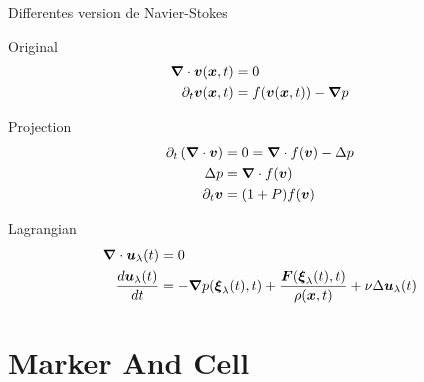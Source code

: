 \begin{frame}[<+->]{Differentes version de Navier-Stokes}
 \begin{block}{Original}
 \begin{align*}
  {\boldsymbol {\nabla}} \cdot {\boldsymbol {v}}({\boldsymbol {x}} ,t)&=0\\
\partial_t {\boldsymbol {v}}({\boldsymbol {x}} ,t)&=f({\boldsymbol {v}}({\boldsymbol {x}},t))-{\boldsymbol {\nabla}}p
\end{align*}
 \end{block}
 \begin{block}{Projection}
 \begin{align*}
    \partial_t \left({\boldsymbol {\nabla}}\cdot {\boldsymbol {v}}\right)&=0={\boldsymbol {\nabla}}\cdot f({\boldsymbol {v}})-\Delta p\\
  \Delta p&={\boldsymbol {\nabla}}\cdot f({\boldsymbol {v}})\\
  \partial_t {\boldsymbol {v}}&=(1+P)f({\boldsymbol {v}})
  \end{align*}
 \end{block}

 \begin{block}{Lagrangian}
  \begin{align*}
{\boldsymbol {\nabla}} \cdot {\boldsymbol {u}}_{\lambda}(t)&=0\\
\frac{d {\boldsymbol {u}}_{\lambda}(t)}{d t}&=-{\boldsymbol {\nabla}} p({\boldsymbol {\xi}}_{\lambda}(t),t)+\frac{{\boldsymbol {F}}({\boldsymbol {\xi}}_{\lambda}(t),t)}{\rho({\boldsymbol {x}},t)}+\nu \Delta {\boldsymbol {u}}_{\lambda}(t)
 \end{align*}
 \end{block}


\end{frame}

\section{Marker And Cell}
